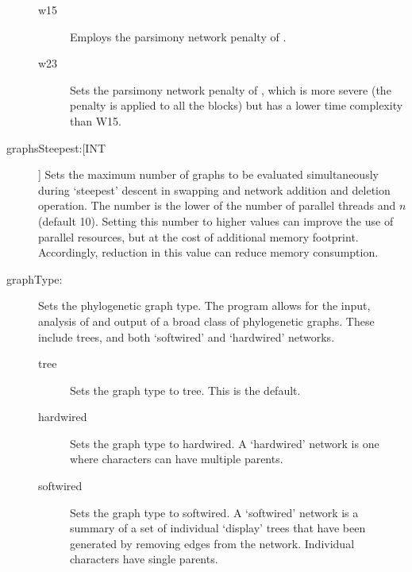 \begin{description}
\begin{description}
			\item[w15] Employs the parsimony network penalty of \cite{Wheeler2015}.	
		
			\item[w23] Sets the parsimony network penalty of \cite{WheelerandWashburn2023}, 
			which is more severe (the penalty is applied to all the blocks) but has a lower time 
			complexity than W15.		

		\end{description}
			
		\item[graphsSteepest:[INT]] Sets the maximum number of graphs to be evaluated 
		simultaneously during `steepest' descent in swapping and network addition and 
		deletion operation. The number is the lower of the number of parallel threads 
		and $n$ (default 10).  Setting this number to higher values can improve the use of 
		parallel resources, but at the cost of additional memory footprint. Accordingly, 
		reduction in this value can reduce memory consumption.
			
		\item[graphType:] Sets the phylogenetic graph type. The program allows for the input, 
		analysis of and output of a broad class of phylogenetic graphs. These include trees, 
		and both `softwired’ and `hardwired’ networks. 
			
		\begin{description}
			
			\item[tree] Sets the graph type to tree. This is the default.
		
			\item[hardwired]  Sets the graph type to hardwired. A `hardwired' network is 
			one where characters can have multiple parents.
	
			\item[softwired]  Sets the graph type to softwired. A `softwired' network is 
			a summary of a set of individual `display' trees that have been generated by 
			removing edges from the network. Individual characters have single parents.	
						
		\end{description}
			



\end{description}
